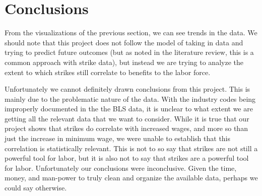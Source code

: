 \documentclass[reqno,11pt]{amsart}
\begin{document}
\section{Conclusions}

From the visualizations of the previous section, we can see trends in the data.
We should note that this project does not follow the model of taking in data and
trying to predict future outcomes (but as noted in the literature review, this
is a common approach with strike data), but instead we are trying to analyze the
extent to which strikes still correlate to benefits to the labor force.






Unfortunately we cannot definitely drawn conclusions from this project. This is mainly due to
the problematic nature of the data. With the industry codes being improperly documented
in the the BLS data, it is unclear to what extent we are getting all the relevant data that
we want to consider. While it is true that our project shows that strikes do correlate
with increased wages, and more so than just the increase in minimum wage, we were unable 
to establish that this correlation is statistically relevant. This is not to so say
that strikes are not still a powerful tool for labor, but it is also not to say
that strikes are a powerful tool for labor. Unfortunately our conclusions were
inconclusive. Given the time, money, and man-power to truly clean and organize 
the available data, perhaps we could say otherwise.
\end{document}
